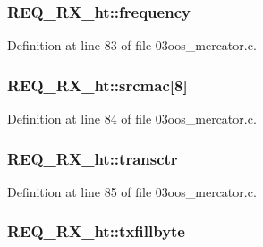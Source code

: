 \subsubsection[{\texorpdfstring{frequency}{frequency}}]{ R\+E\+Q\+\_\+\+R\+X\+\_\+ht\+::frequency}\hypertarget{struct_r_e_q___r_x__ht_ad453ca64bed2bf4c2bb4f097d983439b}{}\label{struct_r_e_q___r_x__ht_ad453ca64bed2bf4c2bb4f097d983439b}


Definition at line 83 of file 03oos\+\_\+mercator.\+c.

\subsubsection[{\texorpdfstring{srcmac}{srcmac}}]{ R\+E\+Q\+\_\+\+R\+X\+\_\+ht\+::srcmac\mbox{[}8\mbox{]}}\hypertarget{struct_r_e_q___r_x__ht_aee119a8dffde5a2ed45161ca7a3058fd}{}\label{struct_r_e_q___r_x__ht_aee119a8dffde5a2ed45161ca7a3058fd}


Definition at line 84 of file 03oos\+\_\+mercator.\+c.

\subsubsection[{\texorpdfstring{transctr}{transctr}}]{ R\+E\+Q\+\_\+\+R\+X\+\_\+ht\+::transctr}\hypertarget{struct_r_e_q___r_x__ht_aecf4f99602dc899d38a9ca58356ae32e}{}\label{struct_r_e_q___r_x__ht_aecf4f99602dc899d38a9ca58356ae32e}


Definition at line 85 of file 03oos\+\_\+mercator.\+c.

\subsubsection[{\texorpdfstring{txfillbyte}{txfillbyte}}]{ R\+E\+Q\+\_\+\+R\+X\+\_\+ht\+::txfillbyte}\hypertarget{struct_r_e_q___r_x__ht_a65dcab1cd6aa1fd6b50bee87b65a4ee3}{}\label{struct_r_e_q___r_x__ht_a65dcab1cd6aa1fd6b50bee87b65a4ee3}


